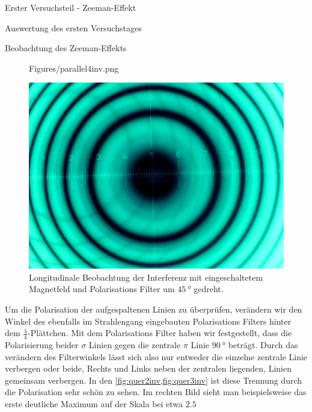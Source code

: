 \documentclass[pdftex, a4paper,11pt, twoside, ngerman]{report}
\begin{document}
\begin{chapter}{Erster Versuchsteil - Zeeman-Effekt}
\begin{section}{Auswertung des ersten Versuchstages}
\begin{subsection}{Beobachtung des Zeeman-Effekts}
\begin{figure}[t!]
\begin{minipage}{0.48\textwidth}
                {Figures/parallel4inv.png}
            \caption{Longitudinale Beobachtung der Interferenz mit 
                eingeschaltetem Magnetfeld und Polarisations Filter um
                $\SI{135}{\degree}$ gedreht.}
            \label{fig:para4inv}
          \end{minipage}\quad
          \begin{minipage}{0.48\textwidth}
            \centering
            \includegraphics[width=\textwidth]
                {Figures/parallel5inv.png}
            \caption{Longitudinale Beobachtung der Interferenz mit 
                eingeschaltetem Magnetfeld und Polarisations Filter um 
                $\SI{45}{\degree}$ gedreht.}
            \label{fig:para5inv}
          \end{minipage}
        \end{figure}
        Um die Polarisation der aufgespaltenen Linien zu überprüfen, verändern
        wir den Winkel des ebenfalls im Strahlengang eingebauten
        Polarisations Filters hinter dem $\frac{\lambda}{4}$-Plättchen. Mit dem
        Polarisations Filter haben wir festgestellt, dass die Polarisierung
        beider $\sigma$ Linien gegen die zentrale $\pi$ Linie $\SI{90}{\degree}$
        beträgt. Durch das verändern des Filterwinkels lässt sich also nur
        entweder die einzelne zentrale Linie verbergen oder beide, Rechts und
        Links neben der zentralen liegenden, Linien gemeinsam verbergen. In den
        \cref{fig:quer2inv,fig:quer3inv} ist diese Trennung durch die
        Polarisation sehr schön zu sehen. Im rechten Bild sieht man
        beispielsweise das erste deutliche Maximum auf der Skala bei etwa $2.5$

\end{subsection}
\end{section}
\end{chapter}
\end{document}
